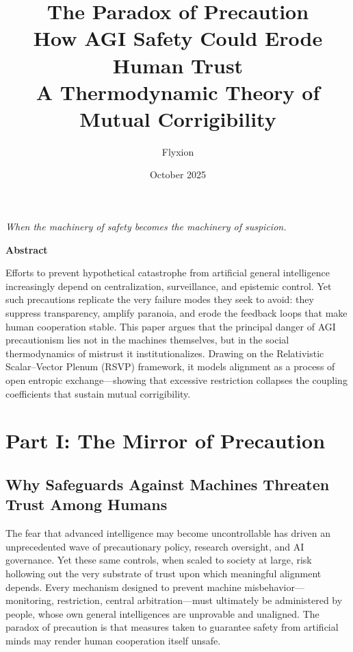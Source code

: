\documentclass[11pt,a4paper]{article}
\title{\Huge\textbf{The Paradox of Precaution}\\
       \vspace{0.5em}
       \Large How AGI Safety Could Erode Human Trust\\
       \vspace{0.5em}
       \normalsize A Thermodynamic Theory of Mutual Corrigibility}
\author{Flyxion}
\date{October 2025}
\theoremstyle{definition}
\theoremstyle{plain}
\begin{document}
\maketitle

\vspace{1em}

\begin{center}
\textit{When the machinery of safety becomes the machinery of suspicion.}
\end{center}

\vspace{1em}

\begin{center}
\textbf{Abstract}
\end{center}

Efforts to prevent hypothetical catastrophe from artificial general intelligence increasingly depend on centralization, surveillance, and epistemic control. 
Yet such precautions replicate the very failure modes they seek to avoid: they suppress transparency, amplify paranoia, and erode the feedback loops that make human cooperation stable. 
This paper argues that the principal danger of AGI precautionism lies not in the machines themselves, but in the social thermodynamics of mistrust it institutionalizes. 
Drawing on the Relativistic Scalar–Vector Plenum (RSVP) framework, it models alignment as a process of open entropic exchange—showing that excessive restriction collapses the coupling coefficients that sustain mutual corrigibility.

\section*{Part I: The Mirror of Precaution}

\subsection*{Why Safeguards Against Machines Threaten Trust Among Humans}

The fear that advanced intelligence may become uncontrollable has driven an unprecedented wave of precautionary policy, research oversight, and AI governance.
Yet these same controls, when scaled to society at large, risk hollowing out the very substrate of trust upon which meaningful alignment depends.
Every mechanism designed to prevent machine misbehavior—monitoring, restriction, central arbitration—must ultimately be administered by people, whose own general intelligences are unprovable and unaligned.
The paradox of precaution is that measures taken to guarantee safety from artificial minds may render human cooperation itself unsafe.
\end{document}
